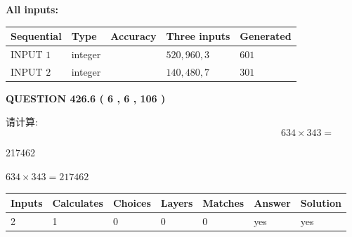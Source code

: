 \documentclass{ctexart}
\begin{document}
   
   
   
\noindent\vspace{0.1in}\hspace{-0.08in} {\textbf{\Large{All inputs: }}}
   
   
  
  
\noindent\begin{tabular}{|l|l|l|l|l|}
\hline
 Sequential & Type & Accuracy & Three inputs & Generated \\ 
\hline
 
 
  INPUT $  1 $ & integer &  & $
 520
 , 
 960
 , 
 3
 $ & $ 601 $ 
 \\  \hline  
 
 
  INPUT $  2 $ & integer &  & $
 140
 , 
 480
 , 
 7
 $ & $ 301 $ 
 \\  \hline  
 \end{tabular}
   
   
  
\vspace{0.2in}
  
{\textbf{\Large{QUESTION
426.6 
 ( 6 , 6 , 106 )
}}}
  
  
 
请计算:
\begin{equation}
634  \times    %
343 = \nonumber
\end{equation}
 
 
 
\noindent{}
 
 

217462
 
 
\noindent{}
 
 

 
 
 
\noindent{}
 
 

$ %
634 \times  %
343=   %
217462$
 
 
\noindent{}
 
 

 
   
   
   
   
\noindent\begin{tabular}{|l|l|l|l|l|l|l|}
 \hline
Inputs & Calculates & Choices & Layers & Matches & Answer & Solution \\ \hline
 2  & 
 1  & 
 0
  & 
 0  & 
 0  & 
  yes & 
  yes 
  \\ \hline
 \end{tabular}
   
\end{document}
